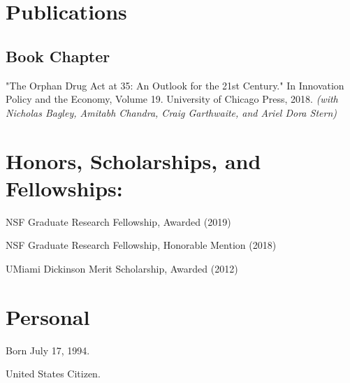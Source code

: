 \documentclass[letterpaper]{article}
\renewenvironment{itemize}{
  \begin{list}{}{
    \setlength{\leftmargin}{1.5em}
  }
}{
  \end{list}
}
\begin{document}
\section*{Publications}

\subsection*{Book Chapter}
\begin{itemize}
\item "The Orphan Drug Act at 35: An Outlook for the 21st Century." In Innovation Policy and the Economy, Volume 19. University of Chicago Press, 2018. \textit{(with Nicholas Bagley, Amitabh Chandra, Craig Garthwaite, and Ariel Dora Stern)}
\end{itemize}

\section*{Honors, Scholarships, and Fellowships:}
\begin{itemize}
\item NSF Graduate Research Fellowship, Awarded (2019)
\item NSF Graduate Research Fellowship, Honorable Mention (2018)
\item UMiami Dickinson Merit Scholarship, Awarded (2012)
\end{itemize}

\section*{Personal}

\begin{itemize}
\item Born July 17, 1994.
\item United States Citizen.
\end{itemize}
\end{document}
